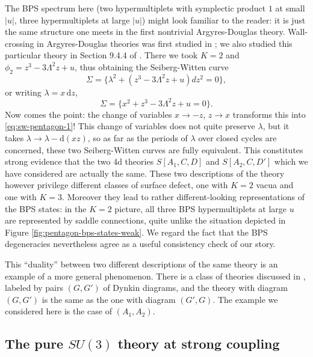 \documentclass[11pt,a4paper]{article}
\newcommand{\abs}[1]{\lvert#1\rvert}
\newcommand\de{{\mathrm{d}}}
\begin{document}
The BPS spectrum here (two hypermultiplets with symplectic product $1$ at small $\abs{u}$,
three hypermultiplets at large $\abs{u}$) might look familiar to the reader:
it is just the same structure one meets in the first nontrivial Argyres-Douglas theory.
Wall-crossing in Argyres-Douglas theories was first studied in \cite{Shapere:1999xr};
we also studied this particular theory in
Section 9.4.4 of \cite{Gaiotto:2009hg}.  There
we took $K=2$ and $\phi_2 = z^3 - 3 \Lambda^2 z + u$,
thus obtaining the Seiberg-Witten curve
\begin{equation}
 \Sigma = \{ \lambda^2 + (z^3 - 3 \Lambda^2 z + u) dz^{2} = 0 \},
\end{equation}
or writing $\lambda = x\, \de z$,
\begin{equation}
 \Sigma = \{ x^2 + z^3 - 3 \Lambda^2 z + u = 0 \}.
\end{equation}
Now comes the point:  the change of variables $x \to -z$, $z \to x$ transforms this into \eqref{eq:sw-pentagon-1}!
This change of variables
does not quite preserve $\lambda$, but it takes $\lambda \to \lambda - \de(x z)$,
so as far as the periods of $\lambda$ over closed cycles
are concerned, these two Seiberg-Witten curves
are fully equivalent.  This constitutes strong evidence that the two 4d
theories $S[A_1, C, D]$ and $S[A_2, C, D']$ which we have considered
are actually the same.
These two descriptions of the theory however
privilege different classes of surface
defect, one with $K=2$ vacua and one with $K=3$.
Moreover they lead to rather different-looking representations of the BPS states:
in the $K=2$ picture, all three BPS hypermultiplets at large $u$ are represented by saddle
connections, quite unlike the situation depicted in Figure \ref{fig:pentagon-bps-states-weak}.  We regard the fact that the BPS degeneracies nevertheless
agree as a useful consistency check of our story.

This ``duality'' between two different descriptions of the same theory is an example
of a more general phenomenon.  There is a class of theories discussed in \cite{Cecotti:2010fi}, labeled by pairs
$(G,G')$ of Dynkin diagrams, and the theory with diagram $(G, G')$ is the same as the one with diagram $(G', G)$.
The example we considered here is the case of $(A_1, A_2)$.


\subsection{The pure $SU(3)$ theory at strong coupling}\label{sec:su3-strong}
\end{document}
